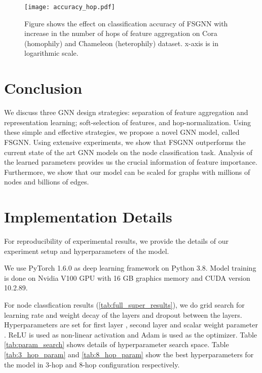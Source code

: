 \documentclass[sigconf,natbib=false]{acmart}
\begin{document}
\begin{figure}[h]
    \centering
    \texttt{[image: accuracy\_hop.pdf]}
    \caption{Figure shows the effect on classification accuracy of FSGNN with increase in the number of hops of feature aggregation on Cora (homophily) and Chameleon (heterophily) dataset. x-axis is in logarithmic scale. }
    \label{fig:accuracy_hop}
\end{figure}



\section{Conclusion}
\label{conclusion}

We discuss three GNN design strategies: separation of feature aggregation and representation learning; soft-selection of features, and hop-normalization. Using these simple and effective strategies, we propose a novel GNN model, called FSGNN. Using extensive experiments, we show that FSGNN outperforms the current state of the art GNN models on the node classification task. Analysis of the learned parameters provides us the crucial information of feature importance. Furthermore, we show that our model can be scaled for graphs with millions of nodes and billions of edges.

\vspace{5mm}
\section*{Implementation Details}

For reproducibility of experimental results, we provide the details of our experiment setup and hyperparameters of the model. 

We use PyTorch 1.6.0 as deep learning framework on Python 3.8. Model training is done on Nvidia V100 GPU with 16 GB graphics memory and CUDA version 10.2.89.

For node classfication results (\ref{tab:full_super_results}), we do grid search for learning rate and weight decay of the layers and dropout between the layers. Hyperparameters are set for first layer , second layer  and scalar weight parameter . ReLU is used as non-linear activation and Adam is used as the optimizer. Table \ref{tab:param_search} shows details of hyperparameter search space. Table \ref{tab:3_hop_param} and \ref{tab:8_hop_param} show the best hyperparameters for the model in 3-hop and 8-hop configuration respectively.
\end{document}
